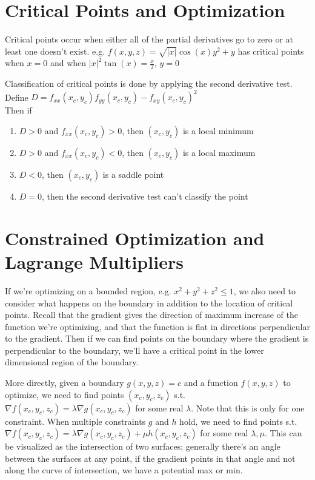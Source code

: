 \documentclass[letterpaper,11pt]{article}
\begin{document}
\section*{Critical Points and Optimization}
Critical points occur when either all of the partial derivatives go to zero or at least one doesn't exist.
e.g. $f(x, y, z) = \sqrt{|x|} \cos(x) y^2 + y $ has critical points when $x = 0$ and when $|x|^2 \tan(x) = \frac{x}{2}$, $y = 0$

Classification of critical points is done by applying the second derivative test.\\
Define $D = f_{xx}(x_c, y_c) f_{yy}(x_c, y_c) - f_{xy}(x_c, y_c)^2$\\
Then if
\begin{enumerate}
  \item $D > 0$ and $f_{xx}(x_c, y_c) > 0$, then $(x_c, y_c)$ is a local minimum
  \item $D > 0$ and $f_{xx}(x_c, y_c) < 0$, then $(x_c, y_c)$ is a local maximum
  \item $D < 0$, then $(x_c, y_c)$ is a saddle point
  \item $D = 0$, then the second derivative test can't classify the point
\end{enumerate}
\section*{Constrained Optimization and Lagrange Multipliers}
If we're optimizing on a bounded region, e.g. $x^2 + y^2 + z^2 \leq 1$,
we also need to consider what happens on the boundary in addition to the location of critical points.
Recall that the gradient gives the direction of maximum increase of the function we're optimizing,
and that the function is flat in directions perpendicular to the gradient.
Then if we can find points on the boundary where the gradient is perpendicular to the boundary,
we'll have a critical point in the lower dimensional region of the boundary.

More directly, given a boundary $g(x, y, z) = c$ and a function $f(x, y, z)$ to optimize,
we need to find points $(x_c, y_c, z_c)$ s.t. $\nabla f(x_c, y_c, z_c) = \lambda \nabla g(x_c, y_c, z_c)$ for some real $\lambda$.
Note that this is only for one constraint. When multiple constraints $g$ and $h$ hold, we need to find points s.t.
$\nabla f(x_c, y_c, z_c) = \lambda \nabla g(x_c, y_c, z_c) + \mu h(x_c, y_c, z_c)$ for some real $\lambda, \mu$.
This can be visualized as the intersection of two surfaces; generally there's an angle between the surfaces at any point,
if the gradient points in that angle and not along the curve of intersection, we have a potential max or min.
\end{document}
